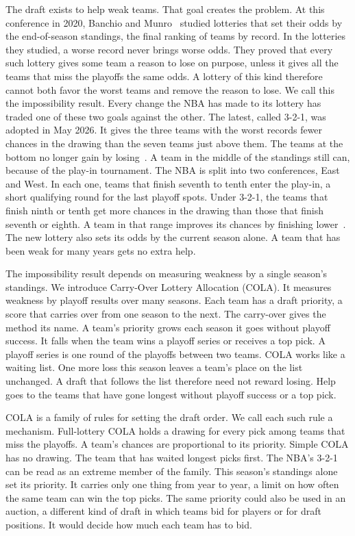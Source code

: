 \documentclass[11pt,letterpaper]{article}
\begin{document}
The draft exists to help weak teams. That goal creates the problem. At this conference in 2020, Banchio and Munro~\cite{munro2020notanking} studied lotteries that set their odds by the end-of-season standings, the final ranking of teams by record. In the lotteries they studied, a worse record never brings worse odds. They proved that every such lottery gives some team a reason to lose on purpose, unless it gives all the teams that miss the playoffs the same odds. A lottery of this kind therefore cannot both favor the worst teams and remove the reason to lose. We call this the impossibility result. Every change the NBA has made to its lottery has traded one of these two goals against the other. The latest, called 3-2-1, was adopted in May 2026. It gives the three teams with the worst records fewer chances in the drawing than the seven teams just above them. The teams at the bottom no longer gain by losing~\cite{oconnor2026lottery}. A team in the middle of the standings still can, because of the play-in tournament. The NBA is split into two conferences, East and West. In each one, teams that finish seventh to tenth enter the play-in, a short qualifying round for the last playoff spots. Under 3-2-1, the teams that finish ninth or tenth get more chances in the drawing than those that finish seventh or eighth. A team in that range improves its chances by finishing lower~\cite{oconnor2026lottery}. The new lottery also sets its odds by the current season alone. A team that has been weak for many years gets no extra help.

The impossibility result depends on measuring weakness by a single season's standings. We introduce Carry-Over Lottery Allocation (COLA). It measures weakness by playoff results over many seasons. Each team has a draft priority, a score that carries over from one season to the next. The carry-over gives the method its name. A team's priority grows each season it goes without playoff success. It falls when the team wins a playoff series or receives a top pick. A playoff series is one round of the playoffs between two teams. COLA works like a waiting list. One more loss this season leaves a team's place on the list unchanged. A draft that follows the list therefore need not reward losing. Help goes to the teams that have gone longest without playoff success or a top pick.

COLA is a family of rules for setting the draft order. We call each such rule a mechanism. Full-lottery COLA holds a drawing for every pick among teams that miss the playoffs. A team's chances are proportional to its priority. Simple COLA has no drawing. The team that has waited longest picks first. The NBA's 3-2-1 can be read as an extreme member of the family. This season's standings alone set its priority. It carries only one thing from year to year, a limit on how often the same team can win the top picks. The same priority could also be used in an auction, a different kind of draft in which teams bid for players or for draft positions. It would decide how much each team has to bid.
\end{document}

